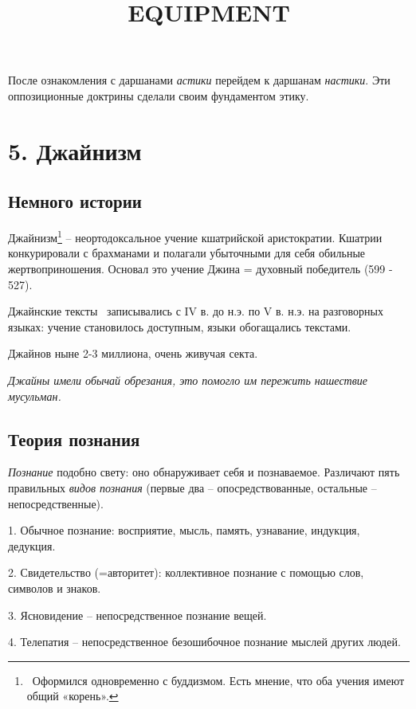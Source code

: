 \documentclass[a4paper]{article}
\title{EQUIPMENT}
\begin{document}
\clearpage\setcounter{page}{1}\pagestyle{Standard}
{
После ознакомления с даршанами \textit{астики} перейдем к даршанам \textit{настики}. Эти оппозиционные доктрины сделали
своим фундаментом этику.}

\section[5. Джайнизм]{ 5. Джайнизм}
\subsection[Немного истории]{ Немного истории}
{
Джайнизм\footnote{\foreignlanguage{russian}{\ Оформился одновременно с буддизмом. Есть мнение, что оба учения имеют
общий «корень».}} – неортодоксальное учение кшатрийской аристократии. Кшатрии конкурировали с брахманами и полагали
убыточными для себя обильные жертвоприношения. Основал это учение Джина = духовный победитель (599 - 527). }

{
Джайнские тексты \ записывались с \foreignlanguage{english}{IV} в. до н.э. по \foreignlanguage{english}{V} в. н.э. на
разговорных языках: учение становилось доступным, языки обогащались текстами.}

{
Джайнов ныне 2-3 миллиона, очень живучая секта.}

{\itshape
Джайны имели обычай обрезания, это помогло им пережить нашествие мусульман. }

\subsection[Теория познания]{ Теория познания}
{
\textit{Познание} подобно свету: оно обнаруживает себя и познаваемое. Различают пять правильных \textit{видов познания}
(первые два – опосредствованные, остальные – непосредственные).}

{
1. Обычное познание: восприятие, мысль, память, узнавание, индукция, дедукция.}

{
2. Свидетельство (=авторитет): коллективное познание с помощью слов, символов и знаков. }

{
3. Ясновидение – непосредственное познание вещей.}

{
4. Телепатия – непосредственное безошибочное познание мыслей других людей.}
\end{document}

